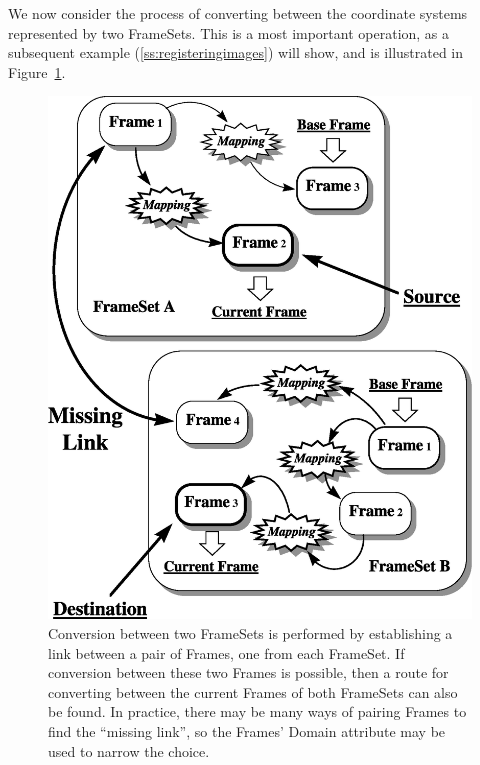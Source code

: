 \documentclass[twoside,11pt]{article}
\newenvironment{latexonly}{}{}
\newcommand{\htmlref}[2]{#1}
\newcommand{\secref}[1]{\S\ref{#1}}
\renewcommand{\secref}[1]{\ref{#1}}
\begin{document}
\begin{latexonly}
   We now consider the process of converting between the coordinate
   systems represented by two FrameSets. This is a most important
   operation, as a subsequent example (\secref{ss:registeringimages})
   will show, and is illustrated in Figure~\ref{fig:fsalign}.
   \begin{figure}
   \begin{center}
   \includegraphics[scale=0.6]{sun211_figures/fsalign.eps}
   \caption{Conversion between two FrameSets is performed by establishing
   a link between a pair of Frames, one from each \htmlref{FrameSet}{FrameSet}. If conversion
   between these two Frames is possible, then a route for converting
   between the current Frames of both FrameSets can also be found. In
   practice, there may be many ways of pairing Frames to find the
   ``missing link'', so the Frames' \htmlref{Domain}{Domain} attribute may be used to
   narrow the choice.}
   \label{fig:fsalign}
   \end{center}
   \end{figure}
\end{latexonly}
\end{document}
